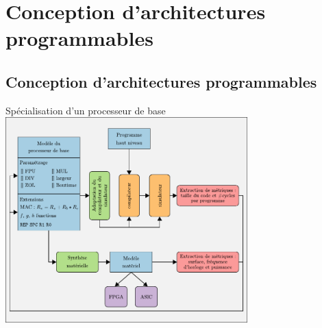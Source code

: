 

\section{Conception d'architectures programmables}



\subsection*{Conception d'architectures programmables}


\begin{frame}[c]{Spécialisation d'un processeur de base}
  \centering
  \includegraphics[width=0.7\textwidth]{./fig/methodos-1}
\end{frame}

